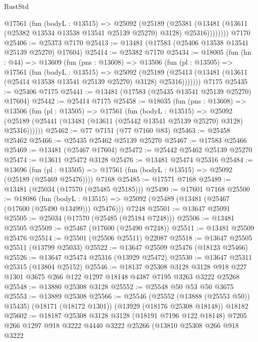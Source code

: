 \begin{lexlean}{RustStd}
\begin{coremodule}
          @17561
            (fun (bodyL : @13515) =>
            @25092
              (@25189
                (@25381
                  (@13481 (@13611 (@25382 @13534 @13538 @13541 @25139 @25270) @3128) @25316))))))))
    @7170
@25406 := @25373 @7170
@25413 := @13481 (@17583 (@25406 @13538 @13541 @25139 @25270) @17604)
@25414 := @25382 @7170
@25434 := @18005
    (fun (hn : @44) =>
    @13609
      (fun (pns : @13608) =>
      @13506
        (fun (pl : @13505) =>
        @17561
          (fun (bodyL : @13515) =>
          @25092
            (@25189
              (@25413 (@13481 (@13611 (@25414 @13538 @13541 @25139 @25270) @3128) @25316)))))))
    @7175
@25435 := @25406 @7175
@25441 := @13481 (@17583 (@25435 @13541 @25139 @25270) @17604)
@25442 := @25414 @7175
@25458 := @18035
    (fun (pns : @13608) =>
    @13506
      (fun (pl : @13505) =>
      @17561
        (fun (bodyL : @13515) =>
        @25092 (@25189 (@25441 (@13481 (@13611 (@25442 @13541 @25139 @25270) @3128) @25316))))))
@25462 := @77 @7151 (@77 @7160 @83)
@25463 := @25458 @25462
@25466 := @25435 @25462 @25139 @25270
@25467 := @17583 @25466
@25469 := @13481 (@25467 @17604)
@25472 := @25442 @25462 @25139 @25270
@25474 := @13611 @25472 @3128
@25476 := @13481 @25474 @25316
@25484 := @13696
    (fun (pl : @13505) => @17561 (fun (bodyL : @13515) => @25092 (@25189 (@25469 @25476))))
    @7168
@25485 := @17571 @7168
@25489 := @13481 (@25034 (@17570 (@25485 @25185)))
@25490 := @17601 @7168
@25500 := @18086
    (fun (bodyL : @13515) => @25092 (@25489 (@13481 (@25467 (@17600 (@25490 @13499))) @25476)))
    @7248
@25501 := @13647 @25091
@25505 := @25034 (@17570 (@25485 (@25184 @7248)))
@25506 := @13481 @25505
@25509 := @25467 (@17600 (@25490 @7248))
@25511 := @13481 @25509 @25476
@25514 := @25501 (@25506 @25511) @22087
@25518 := @13647 @25505 @25511 (@13799 @25033)
@25522 := @13647 @25509 @25476 (@18123 @25466)
@25526 := @13647 @25474 @25316 (@13929 @25472)
@25530 := @13647 @25311 @25315 (@13804 @25152)
@25546 := @18137
    @25308
    @3128
    @3128
    @918
    @227
    @1301
    @3675
    @266
    @122
    @1297
    @18148
    @4387
    @7195
    @3263
    @3222
    @25268
@25548 := @13880 @25308 @3128
@25552 := @25548 @50 @53 @50 @3675
@25553 := @13889 @25308
@25566 := @25546
    (@25552 (@13888 (@25553 @50)) @15435)
    (@18171 (@18172 @1301))
    (@13929 (@18176 @25308 @18148))
    @18182
@25602 := @18187
    @25308
    @3128
    @3128
    (@18191 @7196 @122 @18148)
    @7205
    @266
    @1297
    @918
    @3222
    @4440
    @3222
    @25266
    (@13810
      @25308
      @266
      @918
      @3222

\end{coremodule}
\end{lexlean}
